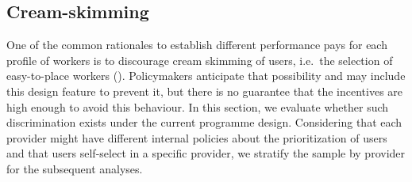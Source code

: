 \documentclass[
  11pt]{article}
\begin{document}
\begin{table}

\caption{\label{tbl-emplawards}Estimates of employment quality effects
for each treatment and contract of the awarded employment spell.}


\end{table}%

\subsection{Cream-skimming}\label{sec-rcream}

One of the common rationales to establish different performance pays for
each profile of workers is to discourage cream skimming of users,
i.e.~the selection of easy-to-place workers
().
Policymakers anticipate that possibility and may include this design
feature to prevent it, but there is no guarantee that the incentives are
high enough to avoid this behaviour. In this section, we evaluate
whether such discrimination exists under the current programme design.
Considering that each provider might have different internal policies
about the prioritization of users and that users self-select in a
specific provider, we stratify the sample by provider for the subsequent
analyses.
\end{document}
